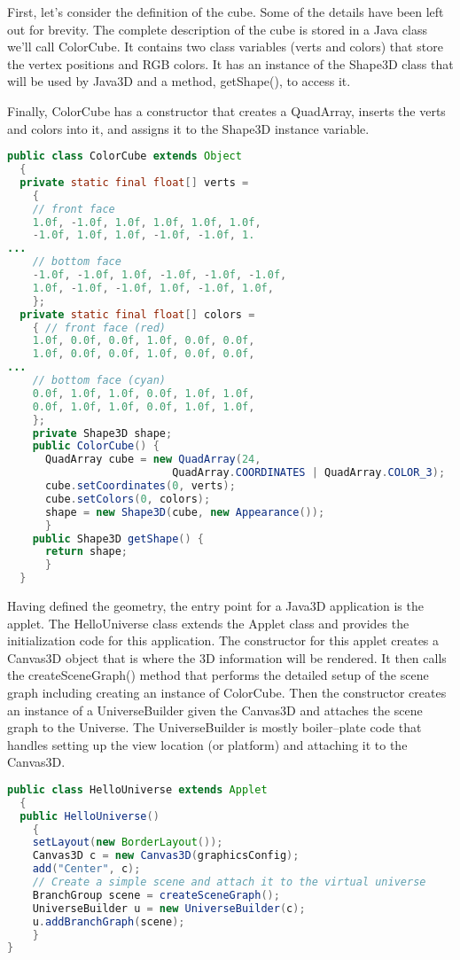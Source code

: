 First, let’s consider the definition of the cube. Some of the details have been left out for brevity. The complete description of the cube is stored in a Java class we’ll call ColorCube. It contains two class variables (verts and colors) that store the vertex positions and RGB colors. It has an instance of the Shape3D class that will be used by Java3D and a method, getShape(), to access it.

Finally, ColorCube has a constructor that creates a QuadArray, inserts the verts and colors into it, and assigns it to the Shape3D instance variable.

\begin{lstlisting}[language=Java, caption={}, numbers=none, frame=none]
public class ColorCube extends Object
  {
  private static final float[] verts =
    {
    // front face
    1.0f, -1.0f, 1.0f, 1.0f, 1.0f, 1.0f,
    -1.0f, 1.0f, 1.0f, -1.0f, -1.0f, 1.
...
    // bottom face
    -1.0f, -1.0f, 1.0f, -1.0f, -1.0f, -1.0f,
    1.0f, -1.0f, -1.0f, 1.0f, -1.0f, 1.0f,
    };
  private static final float[] colors =
    { // front face (red)
    1.0f, 0.0f, 0.0f, 1.0f, 0.0f, 0.0f,
    1.0f, 0.0f, 0.0f, 1.0f, 0.0f, 0.0f,
...
    // bottom face (cyan)
    0.0f, 1.0f, 1.0f, 0.0f, 1.0f, 1.0f,
    0.0f, 1.0f, 1.0f, 0.0f, 1.0f, 1.0f,
    };
    private Shape3D shape;
    public ColorCube() {
      QuadArray cube = new QuadArray(24,
                          QuadArray.COORDINATES | QuadArray.COLOR_3);
      cube.setCoordinates(0, verts);
      cube.setColors(0, colors);
      shape = new Shape3D(cube, new Appearance());
      }
    public Shape3D getShape() {
      return shape;
      }
  }
\end{lstlisting}

Having defined the geometry, the entry point for a Java3D application is the applet. The HelloUniverse class extends the Applet class and provides the initialization code for this application. The constructor for this applet creates a Canvas3D object that is where the 3D information will be rendered. It then calls the createSceneGraph() method that performs the detailed setup of the scene graph including creating an instance of ColorCube. Then the constructor creates an instance of a UniverseBuilder given the Canvas3D and attaches the scene graph to the Universe. The UniverseBuilder is mostly boiler--plate code that handles setting up the view location (or platform) and attaching it to the Canvas3D.

\begin{lstlisting}[language=Java, caption={}, numbers=none, frame=none]
public class HelloUniverse extends Applet
  {
  public HelloUniverse()
    {
    setLayout(new BorderLayout());
    Canvas3D c = new Canvas3D(graphicsConfig);
    add("Center", c);
    // Create a simple scene and attach it to the virtual universe
    BranchGroup scene = createSceneGraph();
    UniverseBuilder u = new UniverseBuilder(c);
    u.addBranchGraph(scene);
    }
}
\end{lstlisting}

